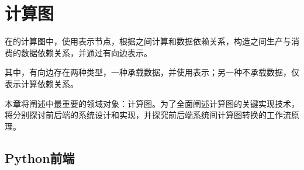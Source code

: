 \begin{savequote}[45mm]
\end{savequote}

\chapter{计算图} 
\label{ch:computation-graph}

\begin{content}

在\tf{}的计算图中，使用表示节点，根据之间计算和数据依赖关系，构造之间生产与消费的数据依赖关系，并通过有向边表示。

其中，有向边存在两种类型，一种承载数据，并使用表示；另一种不承载数据，仅表示计算依赖关系。

本章将阐述\tf{}中最重要的领域对象：计算图。为了全面阐述计算图的关键实现技术，将分别探讨前后端的系统设计和实现，并探究前后端系统间计算图转换的工作流原理。

\end{content}

\section{Python前端}

